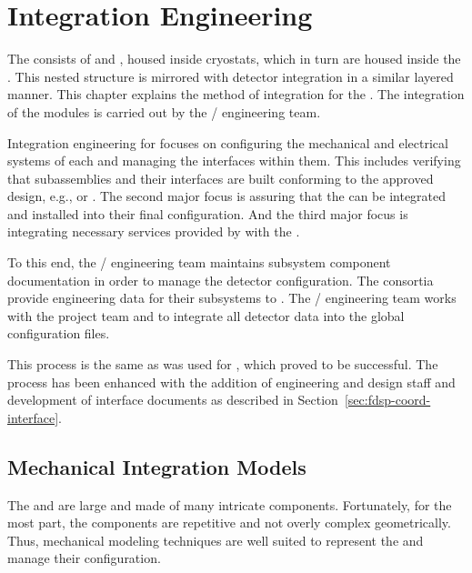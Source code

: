 \chapter{Integration Engineering}
\label{sec:fdsp-coord-integ-sysengr}

The   consists of  and
, housed inside cryostats, which in turn are housed
inside the  .  This nested structure is
mirrored with detector integration in a similar layered manner.  This
chapter explains the method of integration for the .
The integration of the modules is carried out by the
/ engineering team.

Integration engineering for  focuses on configuring the
mechanical and electrical systems of each  and managing
the interfaces within them. This includes verifying that subassemblies
and their interfaces are built conforming to the approved design,
e.g.,  or . The second major focus
is assuring that the  can be integrated and
installed into their final configuration. And the third major focus is
integrating necessary services provided by  
with the .


To this end, the / engineering team maintains
subsystem component documentation in order to manage the detector
configuration. The consortia provide engineering data for their
subsystems to . The / engineering team
works with the  project team and  to integrate
all detector data into the global  configuration files.

This process is the same as was used for , which proved to be
successful. The process has been enhanced with the addition of engineering
and design staff and development of interface documents as described
in Section~\ref{sec:fdsp-coord-interface}.

\section{Mechanical Integration Models}
\label{sec:fdsp-coord-integ-models}

The  and   are large and made of many
intricate components. Fortunately, for the most part, the
components are repetitive and not overly complex
geometrically. Thus, \threed mechanical modeling techniques are well suited
to represent the  and manage their configuration.

